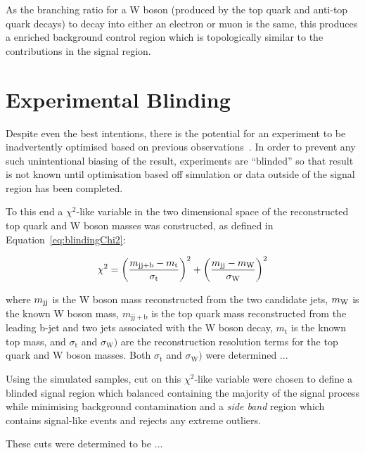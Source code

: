 As the branching ratio for a W boson (produced by the top quark and anti-top quark decays) to decay into either an electron or muon is the same, this produces a \ttbar enriched background control region which is topologically similar to the \ttbar contributions in the signal region. 

\section{Experimental Blinding}\label{sec:blinding}
Despite even the best intentions, there is the potential for an experiment to be inadvertently optimised based on previous observations~\cite{Roodman:2003rw}.
In order to prevent any such unintentional biasing of the result, experiments are ``blinded'' so that result is not known until optimisation based off simulation or data outside of the signal region has been completed.

To this end a $\chi^{2}$-like variable in the two dimensional space of the reconstructed top quark and W boson masses was constructed, as defined in Equation~\ref{eq:blindingChi2}:

\begin{equation}\label{eq:blindingChi2}
   \chi^{2} = {\left(\frac{m_{\mathrm{jj+b}}-m_{\mathrm{t}}}{\sigma_{\mathrm{t}}}\right)}^{2} + {\left(\frac{m_{\rm jj}-m_{\rm W}}{\sigma_{\mathrm{W}}}\right)}^{2}
\end{equation}

where $m_{\rm jj}$ is the W boson mass reconstructed from the two candidate jets, $m_{\rm W}$ is the known W boson mass, $m_{\mathrm{jj+b}}$ is the top quark mass reconstructed from the leading b-jet and two jets associated with the W boson decay, $m_{\mathrm{t}}$ is the known top mass, and $\sigma_{\mathrm{t}}$ and $\sigma_{\mathrm{W}})$ are the reconstruction resolution terms for the top quark and W boson masses.
Both $\sigma_{\mathrm{t}}$ and $\sigma_{\mathrm{W}})$ were determined ...

Using the simulated samples, cut on this $\chi^{2}$-like variable were chosen to define a blinded signal region which balanced containing the majority of the signal process while minimising background contamination and a \emph{side band} region which contains signal-like events and rejects any extreme outliers.

These cuts were determined to be ... 
